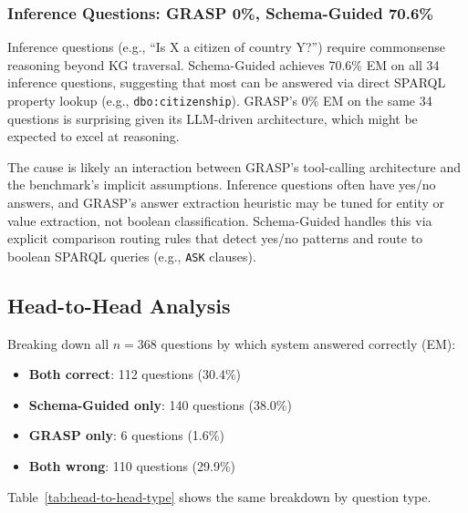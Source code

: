 \subsubsection{Inference Questions: GRASP 0\%, Schema-Guided 70.6\%}

Inference questions (e.g., ``Is X a citizen of country Y?'') require commonsense reasoning beyond KG traversal. Schema-Guided achieves 70.6\% EM on all 34 inference questions, suggesting that most can be answered via direct SPARQL property lookup (e.g., \texttt{dbo:citizenship}). GRASP's 0\% EM on the same 34 questions is surprising given its LLM-driven architecture, which might be expected to excel at reasoning.

The cause is likely an interaction between GRASP's tool-calling architecture and the benchmark's implicit assumptions. Inference questions often have yes/no answers, and GRASP's answer extraction heuristic may be tuned for entity or value extraction, not boolean classification. Schema-Guided handles this via explicit comparison routing rules that detect yes/no patterns and route to boolean SPARQL queries (e.g., \texttt{ASK} clauses).

\subsection{Head-to-Head Analysis}
\label{sec:head-to-head}

Breaking down all $n=368$ questions by which system answered correctly (EM):

\begin{itemize}
\item \textbf{Both correct}: 112 questions (30.4\%)
\item \textbf{Schema-Guided only}: 140 questions (38.0\%)
\item \textbf{GRASP only}: 6 questions (1.6\%)
\item \textbf{Both wrong}: 110 questions (29.9\%)
\end{itemize}

Table~\ref{tab:head-to-head-type} shows the same breakdown by question type.

